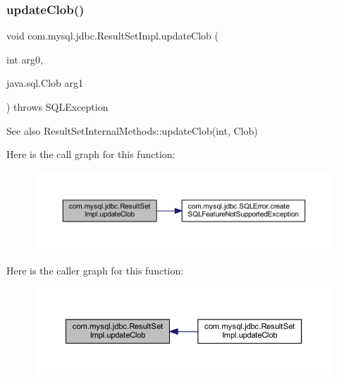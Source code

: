 \subsubsection{\texorpdfstring{update\+Clob()}{updateClob()}\hspace{0.1cm}{\footnotesize\ttfamily [1/2]}}
{\footnotesize\ttfamily void com.\+mysql.\+jdbc.\+Result\+Set\+Impl.\+update\+Clob (\begin{DoxyParamCaption}\item[{int}]{arg0,  }\item[{java.\+sql.\+Clob}]{arg1 }\end{DoxyParamCaption}) throws S\+Q\+L\+Exception}

\begin{DoxySeeAlso}{See also}
Result\+Set\+Internal\+Methods\+::update\+Clob(int, Clob) 
\end{DoxySeeAlso}
Here is the call graph for this function\+:
\nopagebreak
\begin{figure}[H]
\begin{center}
\leavevmode
\includegraphics[width=350pt]{classcom_1_1mysql_1_1jdbc_1_1_result_set_impl_a30158cf109fab3d9e3842ac81fae489d_cgraph}
\end{center}
\end{figure}
Here is the caller graph for this function\+:
\nopagebreak
\begin{figure}[H]
\begin{center}
\leavevmode
\includegraphics[width=350pt]{classcom_1_1mysql_1_1jdbc_1_1_result_set_impl_a30158cf109fab3d9e3842ac81fae489d_icgraph}
\end{center}
\end{figure}
\mbox{\label{classcom_1_1mysql_1_1jdbc_1_1_result_set_impl_a9b169ffea6210a494fc74ead38e60d17}} 
